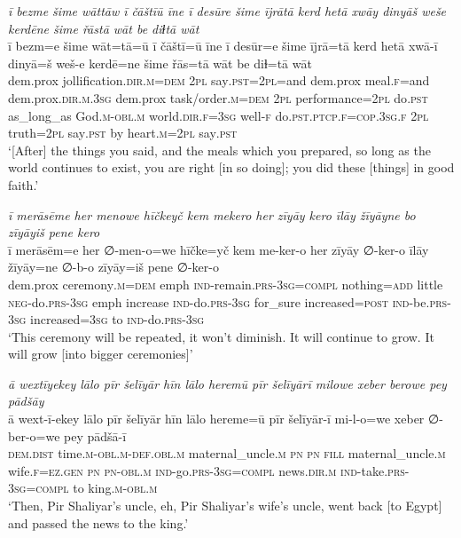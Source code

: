\ea \label{ŽP.244}
\textit{ī bezme šime wāttāw ī čāštīū īne ī desūre šime ījrātā kerd hetā xwāy dinyāš weše kerdēne šime řāstā wāt be diɫtā wāt} \\ 
\gll ī bezm=e šime wāt=tā=ū ī čāštī=ū īne ī desūr=e šime ījrā=tā kerd hetā xwā-ī dinyā=š weš-e kerdē=ne šime řās=tā wāt be diɫ=tā wāt \\ 
 dem.prox jollification\textsc{.dir}\textsc{.m}\textsc{=dem} \textsc{2pl} say\textsc{.pst}=\textsc{2pl}=and dem.prox meal\textsc{.f}=and dem.prox\textsc{.dir}\textsc{.m}\textsc{.3sg} dem.prox task/order\textsc{.m}\textsc{=dem} \textsc{2pl} performance=\textsc{2pl} do\textsc{.pst} as\_long\_as God\textsc{.m}\textsc{-obl}\textsc{.m} world\textsc{.dir}\textsc{.f}\textsc{=3sg} well\textsc{-f} do\textsc{.pst}\textsc{.ptcp}\textsc{.f}\textsc{=cop}\textsc{.3sg}\textsc{.f} \textsc{2pl} truth=\textsc{2pl} say\textsc{.pst} by heart\textsc{.m}=\textsc{2pl} say\textsc{.pst} \\ 
\glt `[After] the things you said, and the meals which you prepared, so long as the world continues to exist, you are right [in so doing]; you did these [things] in good faith.'
\z 
 
\ea \label{ŽP.245}
\textit{ī merāsēme her menowe hīčkeyč kem mekero her zīyāy kero īlāy žīyāyne bo zīyāyiš pene kero} \\ 
\gll ī merāsēm=e her ∅-men-o=we hīčke=yč kem me-ker-o her zīyāy ∅-ker-o īlāy žīyāy=ne ∅-b-o zīyāy=iš pene ∅-ker-o \\ 
 dem.prox ceremony\textsc{.m}\textsc{=dem} emph \textsc{ind-}remain\textsc{.prs}\textsc{-3sg}\textsc{=compl} nothing\textsc{=add} little \textsc{neg-}do\textsc{.prs}\textsc{-3sg} emph increase \textsc{ind-}do\textsc{.prs}\textsc{-3sg} for\_sure increased\textsc{=\textsc{post}} \textsc{ind-}be\textsc{.prs}\textsc{-3sg} increased\textsc{=3sg} to \textsc{ind-}do\textsc{.prs}\textsc{-3sg} \\ 
\glt `This ceremony will be repeated, it won’t diminish. It will continue to grow. It will grow [into bigger ceremonies]'
\z 
 
\ea \label{ŽP.258}
\textit{ā wextīyekey lālo pīr šelīyār hīn lālo heremū pīr šelīyārī milowe xeber berowe pey pādšāy} \\ 
\gll ā wext-ī-ekey lālo pīr šelīyār hīn lālo hereme=ū pīr šelīyār-ī mi-l-o=we xeber ∅-ber-o=we pey pādšā-ī \\ 
 \textsc{dem.dist} time\textsc{.m}\textsc{-obl}\textsc{.m}\textsc{-def}\textsc{.obl}\textsc{.m} maternal\_uncle\textsc{.m} \textsc{pn} \textsc{pn} \textsc{fill} maternal\_uncle\textsc{.m} wife\textsc{.f}\textsc{\textsc{=ez.gen}} \textsc{pn} \textsc{pn}\textsc{-obl}\textsc{.m} \textsc{ind-}go\textsc{.prs}\textsc{-3sg}\textsc{=compl} news\textsc{.dir}\textsc{.m} \textsc{ind-}take\textsc{.prs}\textsc{-3sg}\textsc{=compl} to king\textsc{.m}\textsc{-obl}\textsc{.m} \\ 
\glt `Then, Pir Shaliyar’s uncle, eh, Pir Shaliyar’s wife’s uncle, went back [to Egypt] and passed the news to the king.'
\z 
 

